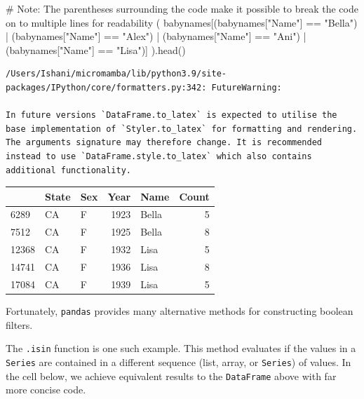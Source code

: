 \documentclass[
  letterpaper,
  DIV=11,
  numbers=noendperiod]{scrreprt}
\newenvironment{Shaded}{\begin{snugshade}}{\end{snugshade}}
\newcommand{\CommentTok}[1]{\textcolor[rgb]{0.37,0.37,0.37}{#1}}
\newcommand{\NormalTok}[1]{\textcolor[rgb]{0.00,0.23,0.31}{#1}}
\newcommand{\OperatorTok}[1]{\textcolor[rgb]{0.37,0.37,0.37}{#1}}
\newcommand{\StringTok}[1]{\textcolor[rgb]{0.13,0.47,0.30}{#1}}
\begin{document}
\begin{Shaded}
\begin{Highlighting}[]
\CommentTok{\# Note: The parentheses surrounding the code make it possible to break the code on to multiple lines for readability}
\NormalTok{(}
\NormalTok{    babynames[(babynames[}\StringTok{"Name"}\NormalTok{] }\OperatorTok{==} \StringTok{"Bella"}\NormalTok{) }\OperatorTok{|} 
\NormalTok{              (babynames[}\StringTok{"Name"}\NormalTok{] }\OperatorTok{==} \StringTok{"Alex"}\NormalTok{) }\OperatorTok{|}
\NormalTok{              (babynames[}\StringTok{"Name"}\NormalTok{] }\OperatorTok{==} \StringTok{"Ani"}\NormalTok{) }\OperatorTok{|}
\NormalTok{              (babynames[}\StringTok{"Name"}\NormalTok{] }\OperatorTok{==} \StringTok{"Lisa"}\NormalTok{)]}
\NormalTok{).head()}
\end{Highlighting}
\end{Shaded}

\begin{verbatim}
/Users/Ishani/micromamba/lib/python3.9/site-packages/IPython/core/formatters.py:342: FutureWarning:

In future versions `DataFrame.to_latex` is expected to utilise the base implementation of `Styler.to_latex` for formatting and rendering. The arguments signature may therefore change. It is recommended instead to use `DataFrame.style.to_latex` which also contains additional functionality.
\end{verbatim}

\begin{tabular}{lllrlr}
\toprule
{} & State & Sex &  Year &   Name &  Count \\
\midrule
6289  &    CA &   F &  1923 &  Bella &      5 \\
7512  &    CA &   F &  1925 &  Bella &      8 \\
12368 &    CA &   F &  1932 &   Lisa &      5 \\
14741 &    CA &   F &  1936 &   Lisa &      8 \\
17084 &    CA &   F &  1939 &   Lisa &      5 \\
\bottomrule
\end{tabular}

Fortunately, \texttt{pandas} provides many alternative methods for
constructing boolean filters.

The \texttt{.isin} function is one such example. This method evaluates
if the values in a \texttt{Series} are contained in a different sequence
(list, array, or \texttt{Series}) of values. In the cell below, we
achieve equivalent results to the \texttt{DataFrame} above with far more
concise code.
\end{document}
